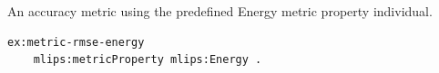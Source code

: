 An accuracy metric using the predefined Energy metric property individual.
\begin{lstlisting}[language=turtle]
ex:metric-rmse-energy
    mlips:metricProperty mlips:Energy .
\end{lstlisting}
